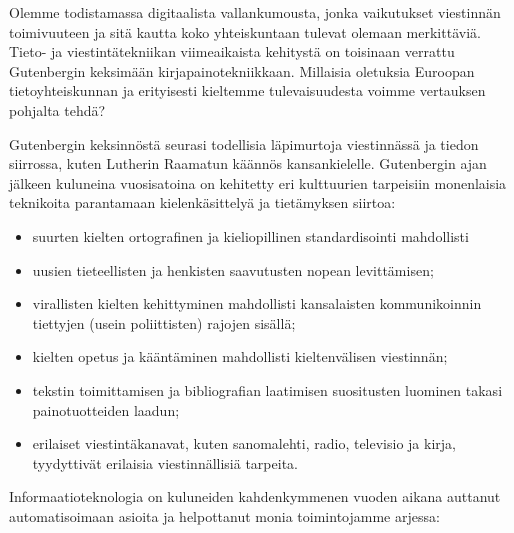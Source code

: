 \begin{multicols}{2}

Olemme todistamassa digitaalista vallankumousta, jonka vaikutukset viestinnän toimivuuteen ja sitä kautta koko yhteiskuntaan tulevat olemaan merkittäviä.  Tieto- ja viestintätekniikan viimeaikaista kehitystä on toisinaan verrattu Gutenbergin keksimään kirjapainotekniikkaan. Millaisia oletuksia Euroopan tietoyhteiskunnan ja erityisesti kieltemme tulevaisuudesta voimme vertauksen pohjalta tehdä?


Gutenbergin keksinnöstä seurasi todellisia läpimurtoja viestinnässä ja tiedon siirrossa, kuten Lutherin Raamatun käännös kansankielelle. Gutenbergin ajan jälkeen kuluneina vuosisatoina on kehitetty eri kulttuurien tarpeisiin monenlaisia teknikoita parantamaan kielenkäsittelyä ja tietämyksen siirtoa:

\begin{itemize}
\item suurten kielten ortografinen ja kieliopillinen standardisointi mahdollisti
\item uusien tieteellisten ja henkisten saavutusten nopean levittämisen;
\item virallisten kielten kehittyminen mahdollisti kansalaisten kommunikoinnin
tiettyjen (usein poliittisten) rajojen sisällä;
\item kielten opetus ja kääntäminen mahdollisti kieltenvälisen viestinnän;
\item tekstin toimittamisen ja bibliografian laatimisen suositusten luominen takasi
painotuotteiden laadun;
\item erilaiset viestintäkanavat, kuten sanomalehti, radio, televisio ja kirja, tyydyttivät erilaisia viestinnällisiä tarpeita.
\end{itemize}

Informaatioteknologia on kuluneiden kahdenkymmenen vuoden aikana auttanut
automatisoimaan asioita ja helpottanut monia toimintojamme arjessa:


\end{multicols}
